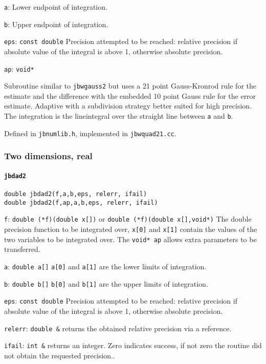 \documentclass[12pt,a4paper]{article}
\newcommand{\mytt}[1]{\texttt{#1}}
\newcommand{\newfunction}[1]{\mytt{#1}\index{\mytt{#1}}}
\begin{document}
\mytt{a}: Lower endpoint of integration.

\mytt{b}: Upper endpoint of integration.

\mytt{eps}: \mytt{const double} Precision attempted to be reached:
relative precision if absolute
value of the integral is above 1, otherwise absolute precision.

\mytt{ap}: \mytt{void*}

Subroutine similar to \mytt{jbwgauss2} but uses a 21 point Gauss-Kronrod rule
for the estimate
and the difference with the embedded 10 point Gauss rule for the error estimate.
Adaptive with a subdivision strategy
better suited for high precision.
The integration is the
lineintegral over the straight line between \mytt{a} and \mytt{b}.

Defined in \mytt{jbnumlib.h}, implemented in \mytt{jbwquad21.cc}.

\subsubsection{Two dimensions, real}

\paragraph{\newfunction{jbdad2}}

\mytt{double jbdad2(f,a,b,eps, relerr, ifail)}\\
\mytt{double jbdad2(f,ap,a,b,eps, relerr, ifail)}

\mytt{f}: \mytt{double (*f)(double x[])} or \mytt{double (*f)(double x[],void*)}
The double precision function to be integrated over, \mytt{x[0]} and \mytt{x[1]} contain the values of the two variables to be integrated over.
The \mytt{void* ap} allows extra parameters to be transferred. 


\mytt{a}: \mytt{double a[]}  \mytt{a[0]} and \mytt{a[1]} are the lower limits of integration.

\mytt{b}: \mytt{double b[]}  \mytt{b[0]} and \mytt{b[1]} are the upper limits of integration.

\mytt{eps}: \mytt{const double} Precision attempted to be reached: relative precision if absolute
value of the integral is above 1, otherwise absolute precision.

\mytt{relerr}: \mytt{double \&} returns the obtained relative precision
via a reference.

\mytt{ifail}: \mytt{int \&} returns an integer. Zero indicates success,
if not zero the routine did not obtain the requested precision..
\end{document}
